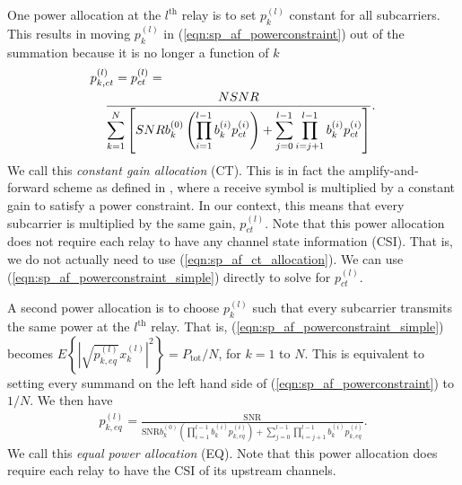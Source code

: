 \documentclass[journal]{IEEEtran}
\begin{document}
One power allocation at the $l^{\mbox{th}}$ relay is to set $p_k^{(l)}$ constant for all subcarriers.  This results in moving $p_k^{(l)}$ in (\ref{eqn:sp_af_powerconstraint}) out of the summation because it is no longer a function of $k$
\begin{eqnarray}
p_{k,ct}^{(l)} = p_{ct}^{(l)} =  \hspace{2.35in} \nonumber \\
\frac{ N \mbox{SNR} } { \displaystyle \sum_{k=1}^N \left[
\mbox{SNR} b_k^{(0)} \left( \displaystyle \prod_{i=1}^{l-1}
b_k^{(i)} p_{ct}^{(i)}\right) + \displaystyle \sum_{j=0}^{l-1}
\displaystyle \prod_{i=j+1}^{l-1} b_k^{(i)} p_{ct}^{(i)} \right]}.
\label{eqn:sp_af_ct_allocation}
\end{eqnarray}
We call this \emph{constant gain allocation} (CT).  This is in fact the amplify-and-forward scheme as defined in \cite{thesis:Laneman01}, where a receive symbol is multiplied by a constant gain to satisfy a power constraint.  In our context, this means that every subcarrier is multiplied by the same gain, $p_{ct}^{(l)}$.  Note that this
power allocation does not require each relay to have any channel
state information (CSI).  That is, we do not actually need to use
(\ref{eqn:sp_af_ct_allocation}).  We can use
(\ref{eqn:sp_af_powerconstraint_simple}) directly to solve for
$p_{ct}^{(l)}$.

A second power allocation is to choose $p_k^{(l)}$ such that every subcarrier transmits the same power at the $l^{\mbox{th}}$ relay.  That is, (\ref{eqn:sp_af_powerconstraint_simple}) becomes $E \left\{ \left| \sqrt{p_{k,eq}^{(l)}} x_k^{(l)} \right| ^2 \right\} = P_{\mbox{tot}}/N$, for $k = 1$ to $N$.  This is equivalent to setting every summand on the left hand side of (\ref{eqn:sp_af_powerconstraint}) to $1/N$.  We then have
\begin{eqnarray}
p_{k,eq}^{(l)} = \frac{\mbox{SNR}}
{\mbox{SNR} b_k^{(0)} \left( \displaystyle\prod_{i=1}^{l-1}b_k^{(i)} p_{k,eq}^{(i)} \right) + \displaystyle\sum_{j=0}^{l-1}
\prod_{i=j+1}^{l-1}  b_k^{(i)} p_{k,eq}^{(i)}} \mbox{.}
\label{}
\end{eqnarray}
We call this \emph{equal power allocation} (EQ).  Note that this power allocation does require each relay to have the CSI of its upstream channels.
\end{document}
